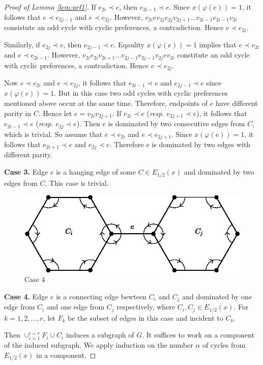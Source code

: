 \documentclass[11pt]{article}
\numberwithin{theorem}{section}
\begin{document}
\begin{proof}[Proof of Lemma \ref{lem:prf1}]
If $e_{2i}\prec e$, then $e_{2i-1}\prec e$. Since $x(\varphi(e))=1$, it follows that $e\prec e_{2j-1}$ and $e\prec e_{2j}$. However, $v_{2i} e v_{2j} e_{2j} v_{2j+1} \ldots v_{2i-1} e_{2i-1} v_{2i}$ consistute an odd cycle with cyclic preferences, a contradiction. Hence $e\prec e_{2i}$.

Similarly, if $e_{2j}\prec e$, then $e_{2j-1}\prec e$. Eqaulity $x(\varphi(e))=1$ implies that $e\prec e_{2i}$ and $e\prec e_{2i-1}$. However, $v_{2i} e_{2i} v_{2i+1} \ldots v_{2j-1} e_{2j-1} v_{2j} e v_{2i}$ constitute an odd cycle with cyclic preferences, a contradiction. Hence $e\prec e_{2j}$. 

Now $e\prec e_{2i}$ and $e\prec e_{2j}$, it follows that $e_{2i-1}\prec e$ and $e_{2j-1}\prec e$ since $x(\varphi(e))=1$. But in this case two odd cycles with cyclic preferences mentioned above occur at the same time. 
Therefore, endpoints of $e$ have different parity in $C$. Hence let $e=v_{2i} v_{2j+1}$.
If $e_{2i}\prec e$ (\textit{resp.} $e_{2j+1}\prec e$), it follows that $e_{2i-1}\prec e$ (\textit{resp.} $e_{2j}\prec e$). Then $e$ is dominated by two consecutive edges from $C$, which is trivial.  So assume that $e\prec e_{2i}$ and $e\prec e_{2j+1}$. Since $x(\varphi(e))=1$, it follows that $e_{2i+1}\prec e$ and $e_{2j}\prec e$. Therefore e is dominated by two edges with different parity.

\textbf{Case 3.} Edge $e$ is a hanging edge of some $C\in E_{1/2}(x)$ and dominated by two edges from $C$. This case is trivial.

\begin{figure}
\centering
\includegraphics[scale=0.85]{KernelMengerianO-fig2}
\caption{Case 4}
\end{figure}
\textbf{Case 4.} Edge $e$ is a connecting edge bewteen $C_i$ and $C_j$ and dominated by one edge from $C_i$ and one edge from $C_j$ respectively, where $C_i, C_j \in E_{1/2}(x)$.
For $k=1,2,\ldots,r$, let $F_k$ be the subset of edges in this case and incident to $C_k$.

Then $\cup_{i=1}^{i=r} F_i\cup C_i$ induces a subgraph of $G$. It suffices to work on a component of the induced subgraph. We apply induction on the number $\alpha$ of cycles from $E_{1/2}(x)$ in a component.


\end{proof}
\end{document}

